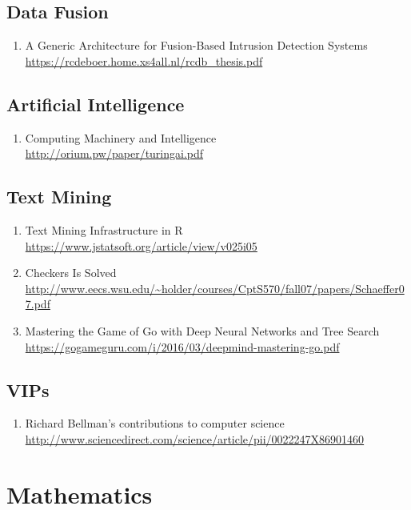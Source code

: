 \documentclass{article}
\begin{document}
\subsection{Data Fusion}

\begin{enumerate}
	\item {A Generic Architecture for Fusion-Based Intrusion Detection Systems\\
\url{https://rcdeboer.home.xs4all.nl/rcdb_thesis.pdf}}
\end{enumerate}

\subsection{Artificial Intelligence}
\begin{enumerate}
	\item {Computing Machinery and Intelligence\\ \url{http://orium.pw/paper/turingai.pdf}}
\end{enumerate}

\subsection{Text Mining}
\begin{enumerate}
	\item {Text Mining Infrastructure in R\\ \url{https://www.jstatsoft.org/article/view/v025i05}}
	\item {Checkers Is Solved\\ \url{http://www.eecs.wsu.edu/~holder/courses/CptS570/fall07/papers/Schaeffer07.pdf}}
	\item{Mastering the Game of Go with Deep Neural Networks and Tree Search  \url{https://gogameguru.com/i/2016/03/deepmind-mastering-go.pdf}}
\end{enumerate}

\subsection{VIPs}
\begin{enumerate}
	\item {Richard Bellman's contributions to computer science\\\url{http://www.sciencedirect.com/science/article/pii/0022247X86901460}}
\end{enumerate}

\section{Mathematics}
\end{document}
